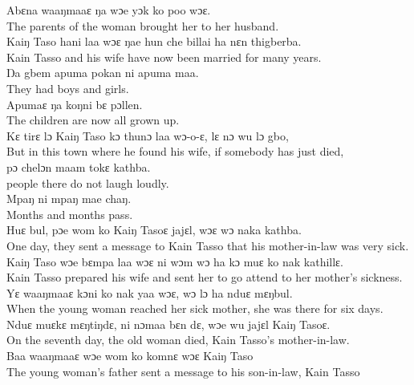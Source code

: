 Abɛna waaŋmaaɛ ŋa wɔe yɔk ko poo wɔɛ.\\
The parents of the woman brought her to her husband.\\

Kaiŋ Taso hani laa wɔɛ ŋae hun che billai ha nɛn thigberba.\\
Kain Tasso and his wife have now been married for many years.\\

Ŋa gbem apuma pokan ni apuma maa.\\
They had boys and girls.\\

Apumaɛ ŋa koŋni bɛ pɔllen.\\
The children are now all grown up.\\

Kɛ tirɛ lɔ Kaiŋ Taso kɔ thunɔ laa wɔ-o-ɛ, lɛ nɔ wu lɔ gbo,\\
But in this town where he found his wife, if somebody has just died,\\

pɔ chelɔn maam tokɛ kathba.\\
people there do not laugh loudly.\\

Mpaŋ ni mpaŋ mae chaŋ.\\
Months and months pass.\\

Huɛ bul, pɔe wom ko Kaiŋ Tasoɛ jajɛl, wɔɛ wɔ naka kathba.\\
One day, they sent a message to Kain Tasso that his mother-in-law was very sick.\\

Kaiŋ Taso wɔe bɛmpa laa wɔɛ ni wɔm wɔ ha kɔ muɛ ko nak kathillɛ.\\
Kain Tasso prepared his wife and sent her to go attend to her mother’s sickness.\\

Yɛ waaŋmaaɛ kɔni ko nak yaa wɔɛ, wɔ lɔ ha nduɛ mɛŋbul.\\
When the young woman reached her sick mother, she was there for six days.\\

Nduɛ muɛkɛ mɛŋtiŋdɛ, ni nɔmaa bɛn dɛ, wɔe wu jajɛl Kaiŋ Tasoɛ.\\
On the seventh day, the old woman died, Kain Tasso’s mother-in-law.\\

Baa waaŋmaaɛ wɔe wom ko komnɛ wɔɛ Kaiŋ Taso\\ 
The young woman’s father sent a message to his son-in-law, Kain Tasso\\

